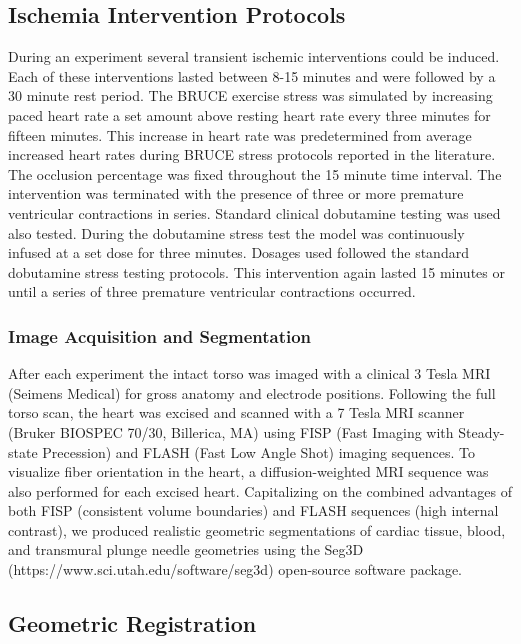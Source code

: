 \documentclass[twocolumn]{cinc}
\begin{document}
\subsection{Ischemia Intervention Protocols}

During an experiment several transient ischemic interventions could be induced. Each of these interventions lasted between 8-15 minutes and were followed by a 30 minute rest period. The BRUCE exercise stress was simulated by increasing paced heart rate a set amount above resting heart rate every three minutes for fifteen minutes. This increase in heart rate was predetermined from average increased heart rates during BRUCE stress protocols reported in the literature. \cite{Okin1986a} The occlusion percentage was fixed throughout the 15 minute time interval. The intervention was terminated with the presence of three or more premature ventricular contractions in series. Standard clinical dobutamine testing was used also tested. During the dobutamine stress test the model was continuously infused at a set dose for three minutes. Dosages used followed the standard dobutamine stress testing protocols. \cite{Secknus1997} This intervention again lasted 15 minutes or until a series of three premature ventricular contractions occurred. 

\subsubsection{Image Acquisition and Segmentation}

After each experiment the intact torso was imaged with a clinical 3 Tesla MRI (Seimens Medical) for gross anatomy and electrode positions. Following the full torso scan, the heart was excised and scanned with a 7 Tesla MRI scanner (Bruker BIOSPEC 70/30, Billerica, MA) using FISP (Fast Imaging with  Steady-state Precession) and FLASH (Fast Low Angle Shot) imaging  sequences. To visualize fiber orientation in the heart, a diffusion-weighted MRI sequence was also performed for each excised heart. Capitalizing on the combined advantages of both FISP (consistent volume boundaries) and FLASH sequences (high internal contrast), we  produced realistic geometric segmentations of cardiac tissue, blood, and  transmural plunge needle geometries using the Seg3D (https://www.sci.utah.edu/software/seg3d) open-source software package.

\subsection{Geometric Registration}
\end{document}
